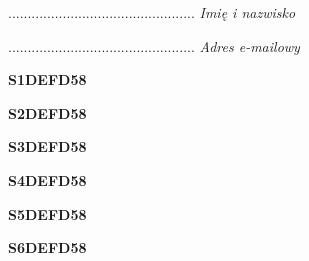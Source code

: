 \begin{turn}{90}\begin{minipage}{\linewidth} \vspace{20mm} ................................................  \textit{Imię i nazwisko}\end{minipage}\end{turn}

\begin{turn}{90}\begin{minipage}{\linewidth} \vspace{20mm} ................................................  \textit{Adres e-mailowy}\end{minipage}\end{turn}

\begin{turn}{90}\huge \begin{minipage}{\linewidth} \vspace{10mm}\textbf{S1DEFD58}\end{minipage}\end{turn}

\begin{turn}{90}\huge \begin{minipage}{\linewidth} \vspace{10mm}\textbf{S2DEFD58}\end{minipage}\end{turn}

\begin{turn}{90}\huge \begin{minipage}{\linewidth} \vspace{10mm}\textbf{S3DEFD58}\end{minipage}\end{turn}

\begin{turn}{90}\huge \begin{minipage}{\linewidth} \vspace{10mm}\textbf{S4DEFD58}\end{minipage}\end{turn}

\begin{turn}{90}\huge \begin{minipage}{\linewidth} \vspace{10mm}\textbf{S5DEFD58}\end{minipage}\end{turn}

\begin{turn}{90}\huge \begin{minipage}{\linewidth} \vspace{10mm}\textbf{S6DEFD58}\end{minipage}\end{turn}

